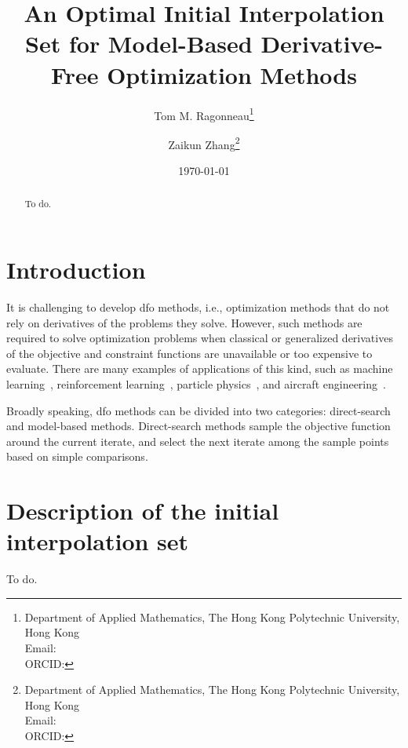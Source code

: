 \documentclass[draft]{article}
\title{An Optimal Initial Interpolation Set for Model-Based Derivative-Free Optimization Methods}
\author{
    Tom M. Ragonneau\thanks{
        Department of Applied Mathematics, The Hong Kong Polytechnic University, Hong Kong\\
        Email: \email{tom.ragonneau@polyu.edu.hk}\\
        ORCID: \orcid{0000-0003-2717-2876}
    } \and
    Zaikun Zhang\thanks{
        Department of Applied Mathematics, The Hong Kong Polytechnic University, Hong Kong\\
        Email: \email{zaikun.zhang@polyu.edu.hk}\\
        ORCID: \orcid{0000-0001-8934-8190}
    }
}
\date{\today}
\begin{document}
\maketitle

\begin{abstract}
    To do.
\end{abstract}

\section{Introduction}

It is challenging to develop \gls{dfo} methods, i.e., optimization methods that do not rely on derivatives of the problems they solve.
However, such methods are required to solve optimization problems when classical or generalized derivatives of the objective and constraint functions are unavailable or too expensive to evaluate.
There are many examples of applications of this kind, such as machine learning~\cite{Ghanbari_Scheinberg_2017}, reinforcement learning~\cite{Qian_Yu_2021}, particle physics~\cite{Eldred_Etal_2022}, and aircraft engineering~\cite{Gazaix_Etal_2019}.

Broadly speaking, \gls{dfo} methods can be divided into two categories: direct-search~\cite{Kolda_Lewis_Torczon_2003} and model-based methods.
Direct-search methods sample the objective function around the current iterate, and select the next iterate among the sample points based on simple comparisons.

\section{Description of the initial interpolation set}

To do.




\listoftodos
\end{document}
